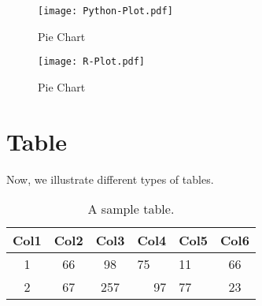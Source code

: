 \documentclass[11pt]{article}
\begin{document}
\begin{figure}[H] %
\centering
\texttt{[image: Python-Plot.pdf]}
\caption{Pie Chart}
\label{fig:pie}
\end{figure}


\begin{figure}[H]
\centering
\texttt{[image: R-Plot.pdf]}
\caption{Pie Chart}
\label{fig:pie}
\end{figure}

\section{Table}
\label{ref:table}
Now, we illustrate different types of tables.

\begin{table}[!htb]
\centering
\caption{A sample table.}
\begin{tabular}{|c|c|c|m{4cm}|l|c|} %

\hline
Col1 & \textbf{Col2} & Col3 & \multicolumn{1}{c|}{Col4} & Col5 & Col6 \\
\hline
1 & 66 & 98 & 75 & 11 & 66 \\
\hline
2 & 67 & 257 & \multicolumn{1}{r|}{97} & 77 & 23 \\
\hline
\end{tabular}
\end{table}
\end{document}
